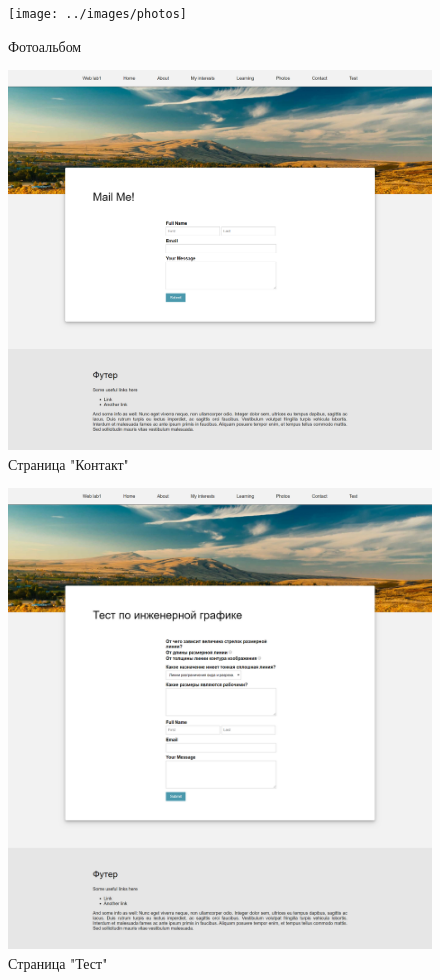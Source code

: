 \documentclass[a4paper,14pt]{extarticle}
\begin{document}
\begin{figure}[H]
    \centering
    \texttt{[image: ../images/photos]}
    \caption{Фотоальбом}
    \label{fig:photos}
\end{figure}
\begin{figure}[H]
    \centering
    \includegraphics[width=.8\linewidth]{../images/contact}
    \caption{Страница "Контакт"}
    \label{fig:contact}
\end{figure}
\begin{figure}[H]
    \centering
    \includegraphics[width=.8\linewidth]{../images/test}
    \caption{Страница "Тест"}
    \label{fig:test}
\end{figure}
\end{document}
